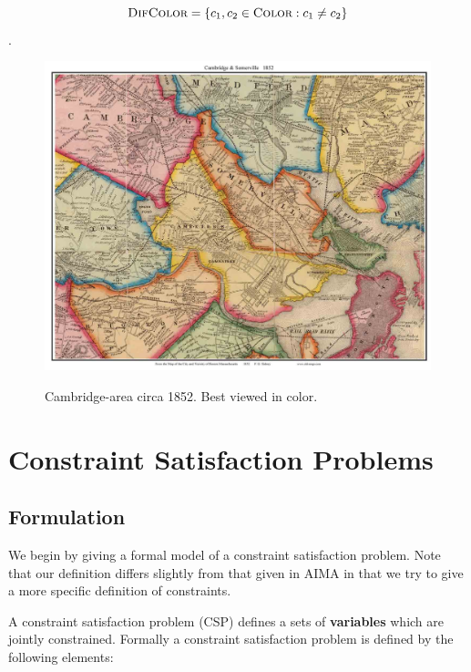 \documentclass[11pt]{article}
\begin{document}
\[\mathrm{\textsc{DifColor}} = \{c_1, c_2 \in \mathrm{\textsc{Color}} : c_1 \neq c_2 \}\].

\begin{figure}[h]
  \centering
  \includegraphics[width=0.8\linewidth]{pics/CambridgeSomerville_1852_web}
  \label{fig:camb}
  \caption{Cambridge-area circa 1852. Best viewed in color.}
\end{figure}



\section{Constraint Satisfaction Problems}

\subsection{Formulation}

We begin by giving a formal model of a constraint satisfaction problem. Note that our definition differs slightly from that given in AIMA in that we try to give a more specific definition of constraints.


A constraint satisfaction problem (CSP) defines a sets of \textbf{variables} which are jointly constrained. Formally a constraint satisfaction problem is defined by the following elements:
\end{document}
